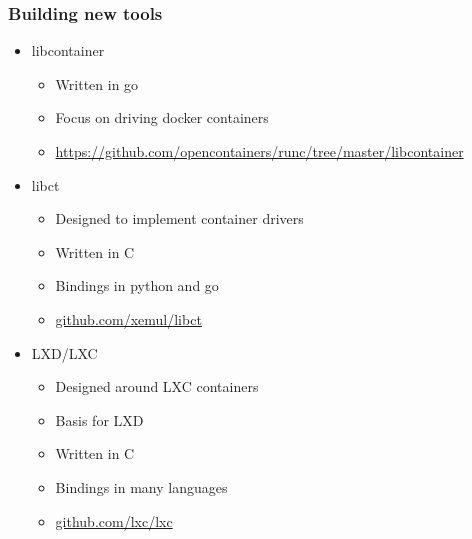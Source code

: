 \documentclass{beamer}
\begin{document}
\begin{frame}
\frametitle{Building new tools}
\begin{itemize}
\item libcontainer
  \begin{itemize}
  \item Written in go
  \item Focus on driving docker containers
  \item \url{https://github.com/opencontainers/runc/tree/master/libcontainer}
  \end{itemize}
\item libct
  \begin{itemize}
  \item Designed to implement container drivers
  \item Written in C
  \item Bindings in python and go
  \item \url{github.com/xemul/libct}
  \end{itemize}
\item LXD/LXC
  \begin{itemize}
  \item Designed around LXC containers
  \item Basis for LXD
  \item Written in C
  \item Bindings in many languages
  \item \url{github.com/lxc/lxc}
  \end{itemize}
\end{itemize}
\end{frame}


\end{document}
